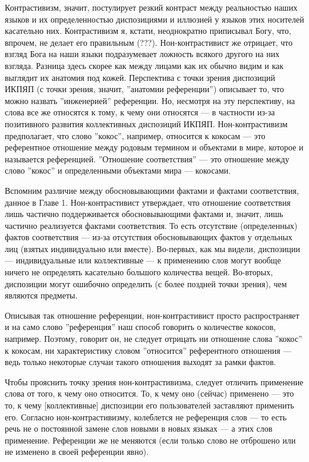 \documentclass[11pt]{book}
\begin{document}
Контрастивизм, значит, постулирует резкий контраст между реальностью наших языков и их определенностью диспозициями и иллюзией у языков этих носителей касательно них. Контрастивизм я, кстати, неоднократно приписывал Богу, что, впрочем, не делает его правильным (???). Нон-контрастивист же отрицает, что взгляд Бога на наши языки подразумевает ложность всякого другого на них взгляда. Разница здесь скорее как между лицами как их обычно видим и как выглядит их анатомия под кожей. Перспектива с точки зрения диспозиций ИКПЯП (с точки зрения, значит, ''анатомии референции'') описывает то, что можно назвать ''инженерией'' референции. Но, несмотря на эту перспективу, на слова все же относятся к тому, к чему они относятся --- в частности из-за позитивного развития коллективных диспозиций ИКПЯП. Нон-контрастивизм предполагает, что слово ''кокос'', например, относится к кокосам --- это референтное отношение между родовым термином и объектами в мире, которое и называется референцией. ''Отношение соответствия'' --- это отношение между слово ''кокос'' и определенными объектами мира --- кокосами.

Вспомним различие между обосновывающими фактами и фактами соответствия, данное в Главе 1. Нон-контрастивист утверждает, что отношение соответствия лишь частично поддерживается обосновывающими фактами и, значит, лишь частично реализуется фактами соответствия. То есть отсутствие (определенных) фактов соответствия --- из-за отсутствия обосновывающих фактов у отдельных лиц (взятых индивидуально или вместе). Во-первых, как мы видели, диспозиции --- индивидуальные или коллективные --- к применению слов могут вообще ничего не определять касательно большого количества вещей. Во-вторых, диспозиции могут ошибочно определить (с более поздней точки зрения), чем являются предметы.

Описывая так отношение референции, нон-контрастивист просто распространяет и на само слово ''референция'' наш способ говорить о количестве кокосов, например. Поэтому, говорит он, не следует отрицать ни отношение слова ''кокос'' к кокосам, ни характеристику словом ''относится'' референтного отношения --- ведь только некоторые случаи такого отношения выходят за рамки фактов.

Чтобы прояснить точку зрения нон-контрастивизма, следует отличить применение слова от того, к чему оно относится. То, к чему оно (сейчас) применено --- это то, к чему [коллективные] диспозиции его пользователей заставляют применить его. Согласно нон-контрастивизму, колеблется не референция слов --- то есть речь не о постоянной замене слов новыми в новых языках --- а этих слов применение. Референции же не меняются (если только слово не отброшено или не изменено в своей референции явно).
\end{document}
